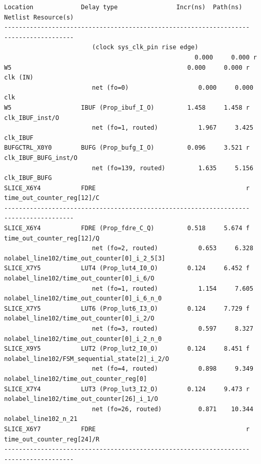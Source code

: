 \documentclass{report}
\newenvironment{narrowmargins}{
    \begin{adjustwidth}{-0.75in}{0.25in} %
}{
    \end{adjustwidth}
}
\begin{document}
\begin{narrowmargins}
\begin{verbatim}
Location             Delay type                Incr(ns)  Path(ns)    Netlist Resource(s)
-------------------------------------------------------------------    -------------------
                        (clock sys_clk_pin rise edge)
                                                    0.000     0.000 r  
W5                                                0.000     0.000 r  clk (IN)
                        net (fo=0)                   0.000     0.000    clk
W5                   IBUF (Prop_ibuf_I_O)         1.458     1.458 r  clk_IBUF_inst/O
                        net (fo=1, routed)           1.967     3.425    clk_IBUF
BUFGCTRL_X0Y0        BUFG (Prop_bufg_I_O)         0.096     3.521 r  clk_IBUF_BUFG_inst/O
                        net (fo=139, routed)         1.635     5.156    clk_IBUF_BUFG
SLICE_X6Y4           FDRE                                         r  time_out_counter_reg[12]/C
-------------------------------------------------------------------    -------------------
SLICE_X6Y4           FDRE (Prop_fdre_C_Q)         0.518     5.674 f  time_out_counter_reg[12]/Q
                        net (fo=2, routed)           0.653     6.328    nolabel_line102/time_out_counter[0]_i_2_5[3]
SLICE_X7Y5           LUT4 (Prop_lut4_I0_O)        0.124     6.452 f  nolabel_line102/time_out_counter[0]_i_6/O
                        net (fo=1, routed)           1.154     7.605    nolabel_line102/time_out_counter[0]_i_6_n_0
SLICE_X7Y5           LUT6 (Prop_lut6_I3_O)        0.124     7.729 f  nolabel_line102/time_out_counter[0]_i_2/O
                        net (fo=3, routed)           0.597     8.327    nolabel_line102/time_out_counter[0]_i_2_n_0
SLICE_X9Y5           LUT2 (Prop_lut2_I0_O)        0.124     8.451 f  nolabel_line102/FSM_sequential_state[2]_i_2/O
                        net (fo=4, routed)           0.898     9.349    nolabel_line102/time_out_counter_reg[0]
SLICE_X7Y4           LUT3 (Prop_lut3_I2_O)        0.124     9.473 r  nolabel_line102/time_out_counter[26]_i_1/O
                        net (fo=26, routed)          0.871    10.344    nolabel_line102_n_21
SLICE_X6Y7           FDRE                                         r  time_out_counter_reg[24]/R
-------------------------------------------------------------------    -------------------


\end{verbatim}
\end{narrowmargins}
\end{document}
